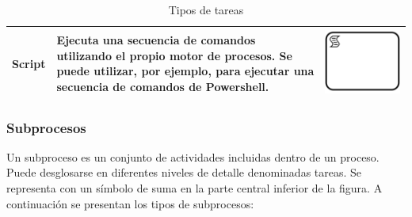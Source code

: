 \begin{table}[H]
\begin{tabular}{|p{2cm}|p{9.5cm}|p{1.7cm} |}
	{\small Script } & {\small Ejecuta una secuencia de comandos utilizando el propio motor de procesos. Se puede utilizar, por ejemplo, para ejecutar una secuencia de comandos de Powershell.} & \vspace{0.5mm} \hspace{2mm} \includegraphics[scale=0.1]{Capitulo2/imagenes/TScript} \\
		\hline
		
		
	\end{tabular}
	\caption{Tipos de tareas \citep{Bauab2018}}
	\label{tabla:tiposDeTareas}
\end{table}

\subsubsection{Subprocesos}
Un subproceso es un conjunto de actividades incluidas dentro de un
proceso. Puede desglosarse en diferentes niveles de detalle denominadas
tareas. Se representa con un símbolo de suma en la parte central inferior
de la figura. A continuación se presentan los tipos de subprocesos:

